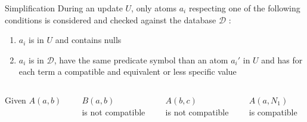 \begin{frame}{Simplification}
    During an update $U$, only atoms $a_i$ respecting one of the following conditions is considered and checked against the database $\mathcal{D}$ :
    \vfill
    \begin{enumerate}
        \item $a_i$ is in $U$ and contains nulls
              \pause\vfill
        \item $a_i$ is in $\mathcal{D}$, have the same predicate symbol than an atom $a_i'$ in $U$ and has for each term a compatible and equivalent or less specific value
    \end{enumerate}
    \vfill
    \pause
    \begin{columns}
        \begin{column}{.25\textwidth}
            Given $A(a, b)$\\
        \end{column}
        \hfill
        \begin{column}{.25\textwidth}
            \centering
            $B(a, b)$\\ is not compatible
        \end{column}
        \hfill
        \begin{column}{.25\textwidth}
            \centering
            $A(b, c)$\\ is not compatible
        \end{column}
        \hfill
        \begin{column}{.25\textwidth}
            \centering
            $A(a, N_1)$\\ is compatible
        \end{column}
    \end{columns}
\end{frame}

